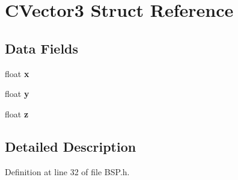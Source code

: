 \hypertarget{struct_c_vector3}{}\section{C\+Vector3 Struct Reference}
\label{struct_c_vector3}
\subsection*{Data Fields}
\begin{DoxyCompactItemize}
\item 
float {\bfseries x}\hypertarget{struct_c_vector3_a06b092361b335f9971323be0ddf759b1}{}\label{struct_c_vector3_a06b092361b335f9971323be0ddf759b1}

\item 
float {\bfseries y}\hypertarget{struct_c_vector3_a20d0b1099477995b22a4f1407e41a7a1}{}\label{struct_c_vector3_a20d0b1099477995b22a4f1407e41a7a1}

\item 
float {\bfseries z}\hypertarget{struct_c_vector3_a9dd3ce85f6aaa17ccc67bfe50a089b3a}{}\label{struct_c_vector3_a9dd3ce85f6aaa17ccc67bfe50a089b3a}

\end{DoxyCompactItemize}


\subsection{Detailed Description}


Definition at line 32 of file B\+S\+P.\+h.

